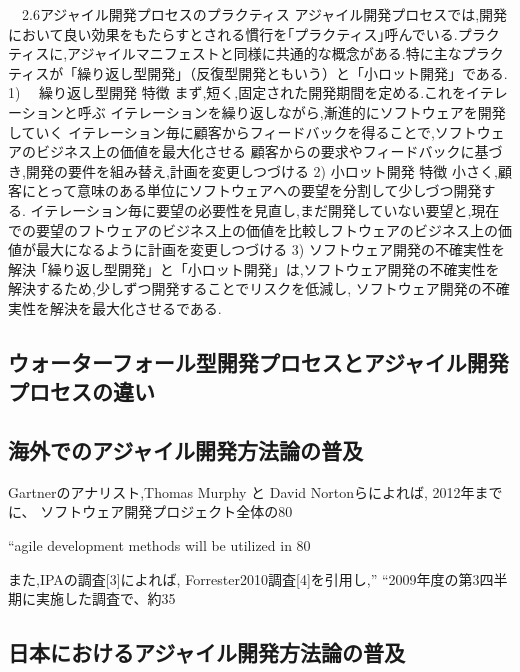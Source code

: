 \documentclass[paper]{jrsj}
\begin{document}
　2.6アジャイル開発プロセスのプラクティス
アジャイル開発プロセスでは,開発において良い効果をもたらすとされる慣行を｢プラクティス｣呼んでいる.プラクティスに,アジャイルマニフェストと同様に共通的な概念がある.特に主なプラクティスが「繰り返し型開発」（反復型開発ともいう）と「小ロット開発」である.
1)　 繰り返し型開発
	特徴
	まず,短く,固定された開発期間を定める.これをイテレーションと呼ぶ
	イテレーションを繰り返しながら,漸進的にソフトウェアを開発していく
	イテレーション毎に顧客からフィードバックを得ることで,ソフトウェアのビジネス上の価値を最大化させる
	顧客からの要求やフィードバックに基づき,開発の要件を組み替え,計画を変更しつづける
2)	小ロット開発
	特徴
	小さく,顧客にとって意味のある単位にソフトウェアへの要望を分割して少しづつ開発する.
	イテレーション毎に要望の必要性を見直し,まだ開発していない要望と,現在での要望のフトウェアのビジネス上の価値を比較しフトウェアのビジネス上の価値が最大になるように計画を変更しつづける
3)	ソフトウェア開発の不確実性を解決
｢繰り返し型開発」と「小ロット開発」は,ソフトウェア開発の不確実性を解決するため,少しずつ開発することでリスクを低減し, ソフトウェア開発の不確実性を解決を最大化させるである.

\subsection{ウォーターフォール型開発プロセスとアジャイル開発プロセスの違い}

\subsection{海外でのアジャイル開発方法論の普及}
Gartnerのアナリスト,Thomas Murphy と David Nortonらによれば, 2012年までに、
ソフトウェア開発プロジェクト全体の80%

“agile development methods will be utilized in 80%

また,IPAの調査[3]によれば, Forrester2010調査[4]を引用し,” “2009年度の第3四半期に実施した調査で、約35%

\subsection{日本におけるアジャイル開発方法論の普及}
\end{document}
